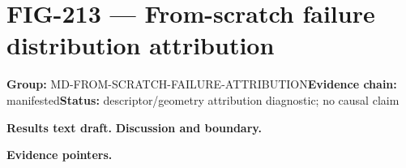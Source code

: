 \clearpage
\section{FIG-213 --- From-scratch failure distribution attribution}
\label{figpage:fig-213}
\textbf{Group:} MD-FROM-SCRATCH-FAILURE-ATTRIBUTION\quad \textbf{Evidence chain:} manifested\quad \textbf{Status:} descriptor/geometry attribution diagnostic; no causal claim

\textbf{Results text draft.} 
\textbf{Discussion and boundary.} 


\textbf{Evidence pointers.}



\vfill
